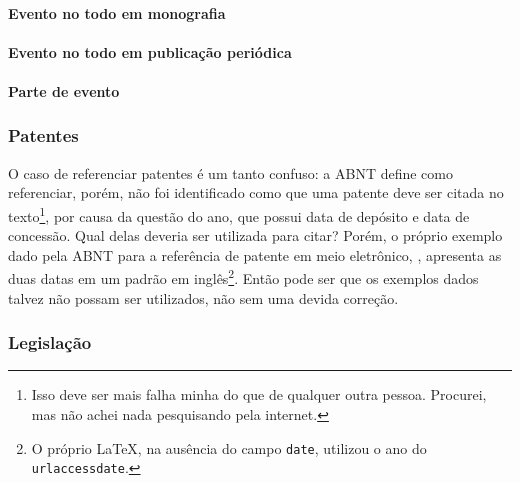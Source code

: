 \paragraph{Evento no todo em monografia}


\cite{evento:ex3}

\paragraph{Evento no todo em publicação periódica}

\paragraph{Parte de evento}



\subsubsection{Patentes}
O caso de referenciar patentes é um tanto confuso: a ABNT define como referenciar, porém, não foi identificado como que uma patente deve ser citada no texto\footnote{Isso deve ser mais falha minha do que de qualquer outra pessoa. Procurei, mas não achei nada pesquisando pela internet.}, por causa da questão do ano, que possui data de depósito e data de concessão. Qual delas deveria ser utilizada para citar? Porém, o próprio exemplo dado pela ABNT para a referência de patente em meio eletrônico, \cite{patente:eletronico}, apresenta as duas datas em um padrão em inglês\footnote{O próprio \LaTeX, na ausência do campo \texttt{date}, utilizou o ano do \texttt{urlaccessdate}.}. Então pode ser que os exemplos dados talvez não possam ser utilizados, não sem uma devida correção.




\subsubsection{Legislação}

